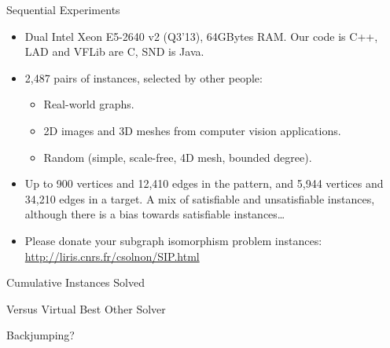 \documentclass{beamer}
\begin{document}
\begin{frame}{Sequential Experiments}
    \begin{itemize}
        \item Dual Intel Xeon E5-2640 v2 (Q3'13), 64GBytes RAM. Our code is C++, LAD and VFLib are C, SND is Java.

        \item 2,487 pairs of instances, selected by other people:
            \begin{itemize}
                \item Real-world graphs.
                \item 2D images and 3D meshes from computer vision applications.
                \item Random (simple, scale-free, 4D mesh, bounded degree).
            \end{itemize}

        \item Up to 900 vertices and 12,410 edges in the pattern, and 5,944 vertices and 34,210
            edges in a target. A mix of satisfiable and unsatisfiable instances, although there is a
            bias towards satisfiable instances\ldots

        \item Please donate your subgraph isomorphism problem instances: \\
            \centering \url{http://liris.cnrs.fr/csolnon/SIP.html}
    \end{itemize}
\end{frame}

\begin{frame}{Cumulative Instances Solved}
    \only<1>{
        
    }
    \only<2>{
        
    }
\end{frame}

\begin{frame}{Versus Virtual Best Other Solver}
    \only<1>{
        
    }
\end{frame}

\begin{frame}{Backjumping?}
    \only<1>{
        
    }
\end{frame}
\end{document}
